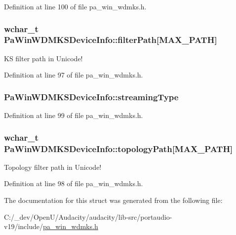 Definition at line 100 of file pa\+\_\+win\+\_\+wdmks.\+h.

\subsubsection[{\texorpdfstring{filter\+Path}{filterPath}}]{\setlength{\rightskip}{0pt plus 5cm}wchar\+\_\+t Pa\+Win\+W\+D\+M\+K\+S\+Device\+Info\+::filter\+Path\mbox{[}M\+A\+X\+\_\+\+P\+A\+TH\mbox{]}}\hypertarget{struct_pa_win_w_d_m_k_s_device_info_aef789b50c6cf1e05c5c6e1e18e2a233c}{}\label{struct_pa_win_w_d_m_k_s_device_info_aef789b50c6cf1e05c5c6e1e18e2a233c}
KS filter path in Unicode! 

Definition at line 97 of file pa\+\_\+win\+\_\+wdmks.\+h.

\subsubsection[{\texorpdfstring{streaming\+Type}{streamingType}}]{ Pa\+Win\+W\+D\+M\+K\+S\+Device\+Info\+::streaming\+Type}\hypertarget{struct_pa_win_w_d_m_k_s_device_info_a65b71d52a0990fdb97201d0cea3f05f1}{}\label{struct_pa_win_w_d_m_k_s_device_info_a65b71d52a0990fdb97201d0cea3f05f1}


Definition at line 99 of file pa\+\_\+win\+\_\+wdmks.\+h.

\subsubsection[{\texorpdfstring{topology\+Path}{topologyPath}}]{\setlength{\rightskip}{0pt plus 5cm}wchar\+\_\+t Pa\+Win\+W\+D\+M\+K\+S\+Device\+Info\+::topology\+Path\mbox{[}M\+A\+X\+\_\+\+P\+A\+TH\mbox{]}}\hypertarget{struct_pa_win_w_d_m_k_s_device_info_a89df08f196f4bc367794e7d76e404a04}{}\label{struct_pa_win_w_d_m_k_s_device_info_a89df08f196f4bc367794e7d76e404a04}
Topology filter path in Unicode! 

Definition at line 98 of file pa\+\_\+win\+\_\+wdmks.\+h.



The documentation for this struct was generated from the following file\+:\begin{DoxyCompactItemize}
\item 
C\+:/\+\_\+dev/\+Open\+U/\+Audacity/audacity/lib-\/src/portaudio-\/v19/include/\hyperlink{pa__win__wdmks_8h}{pa\+\_\+win\+\_\+wdmks.\+h}\end{DoxyCompactItemize}
